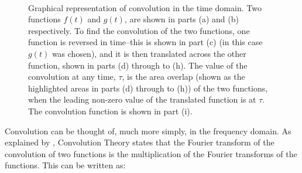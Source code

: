 \begin{figure}[p]
\begin{center}
{	\label{fig:conv_t3}
}
\\
\caption[Graphical representation of convolution in the time domain]{Graphical representation of convolution in the time domain. Two functions $f\left(t\right)$ and $g\left(t\right)$, are shown in parts (a) and (b) respectively. To find the convolution of the two functions, one function is reversed in time--this is shown in part (c) (in this case $g\left(t\right)$ was chosen), and it is then translated across the other function, shown in parts (d) through to (h). The value of the convolution at any time, $\tau$, is the area overlap (shown as the highlighted areas in parts (d) through to (h)) of the two functions, when the leading non-zero value of the translated function is at $\tau$. The convolution function is shown in part (i).}\label{fig:convolution_time}
\end{center}
\end{figure}
Convolution can be thought of, much more simply, in the frequency domain. As explained by \textcite[chap. 2]{Bracewell2000}, Convolution Theory states that the Fourier transform of the convolution of two functions is the multiplication of the Fourier transforms of the functions. This can be written as:
